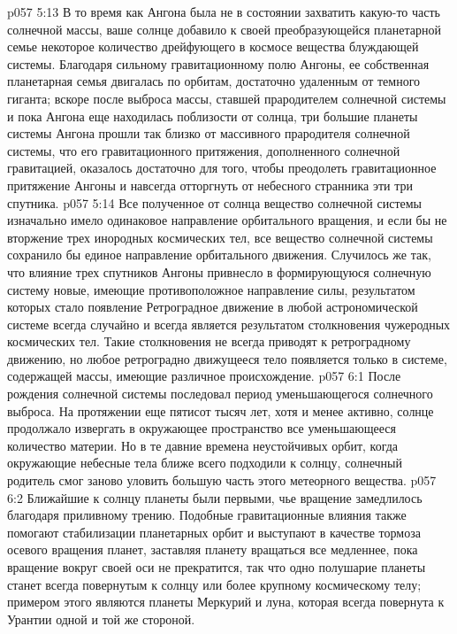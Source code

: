 \vs p057 5:13 \pc В то время как Ангона была не в состоянии захватить какую\hyp{}то часть солнечной массы, ваше солнце добавило к своей преобразующейся планетарной семье некоторое количество дрейфующего в космосе вещества блуждающей системы. Благодаря сильному гравитационному полю Ангоны, ее собственная планетарная семья двигалась по орбитам, достаточно удаленным от темного гиганта; вскоре после выброса массы, ставшей прародителем солнечной системы и пока Ангона еще находилась поблизости от солнца, три большие планеты системы Ангона прошли так близко от массивного прародителя солнечной системы, что его гравитационного притяжения, дополненного солнечной гравитацией, оказалось достаточно для того, чтобы преодолеть гравитационное притяжение Ангоны и навсегда отторгнуть от небесного странника эти три спутника.
\vs p057 5:14 Все полученное от солнца вещество солнечной системы изначально имело одинаковое направление орбитального вращения, и если бы не вторжение трех инородных космических тел, все вещество солнечной системы сохранило бы единое направление орбитального движения. Случилось же так, что влияние трех спутников Ангоны привнесло в формирующуюся солнечную систему новые, имеющие противоположное направление силы, результатом которых стало появление  Ретроградное движение в любой астрономической системе всегда случайно и всегда является результатом столкновения чужеродных космических тел. Такие столкновения не всегда приводят к ретроградному движению, но любое ретроградно движущееся тело появляется только в системе, содержащей массы, имеющие различное происхождение.
\vs p057 6:1 После рождения солнечной системы последовал период уменьшающегося солнечного выброса. На протяжении еще пятисот тысяч лет, хотя и менее активно, солнце продолжало извергать в окружающее пространство все уменьшающееся количество материи. Но в те давние времена неустойчивых орбит, когда окружающие небесные тела ближе всего подходили к солнцу, солнечный родитель смог заново уловить большую часть этого метеорного вещества.
\vs p057 6:2 \pc Ближайшие к солнцу планеты были первыми, чье вращение замедлилось благодаря приливному трению. Подобные гравитационные влияния также помогают стабилизации планетарных орбит и выступают в качестве тормоза осевого вращения планет, заставляя планету вращаться все медленнее, пока вращение вокруг своей оси не прекратится, так что одно полушарие планеты станет всегда повернутым к солнцу или более крупному космическому телу; примером этого являются планеты Меркурий и луна, которая всегда повернута к Урантии одной и той же стороной.
